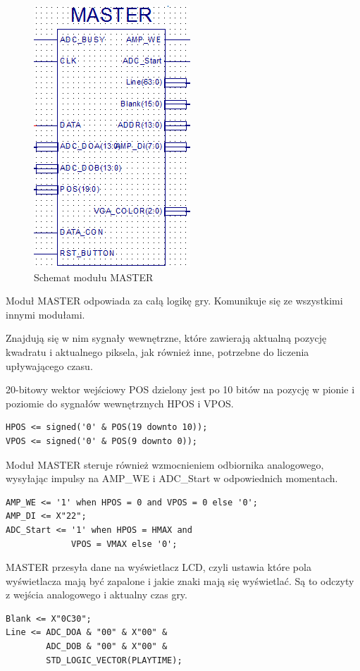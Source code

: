 \documentclass[11pt]{article}
\begin{document}
\begin{figure}[h!]
\center
\includegraphics[scale=1]{MASTER.png}
\caption{Schemat modułu MASTER}
\end{figure}

Moduł MASTER odpowiada za całą logikę gry.
Komunikuje się ze wszystkimi innymi modułami.

Znajdują się w nim sygnały wewnętrzne, które zawierają aktualną pozycję kwadratu i aktualnego piksela, jak również inne, potrzebne do liczenia upływającego czasu.

20-bitowy wektor wejściowy POS dzielony jest po 10 bitów na pozycję w pionie i poziomie do sygnałów wewnętrznych HPOS i VPOS.

\begin{lstlisting}
HPOS <= signed('0' & POS(19 downto 10));
VPOS <= signed('0' & POS(9 downto 0));
\end{lstlisting}

Moduł MASTER steruje również wzmocnieniem odbiornika analogowego, wysyłając impulsy na AMP\_WE i ADC\_Start w odpowiednich momentach.

\begin{lstlisting}
AMP_WE <= '1' when HPOS = 0 and VPOS = 0 else '0';
AMP_DI <= X"22";
ADC_Start <= '1' when HPOS = HMAX and
             VPOS = VMAX else '0';
\end{lstlisting}

MASTER przesyła dane na wyświetlacz LCD, czyli ustawia które pola wyświetlacza mają być zapalone i jakie znaki mają się wyświetlać.
Są to odczyty z wejścia analogowego i aktualny czas gry.

\begin{lstlisting}
Blank <= X"0C30";
Line <= ADC_DOA & "00" & X"00" &
        ADC_DOB & "00" & X"00" &
        STD_LOGIC_VECTOR(PLAYTIME);
\end{lstlisting}	
\end{document}
